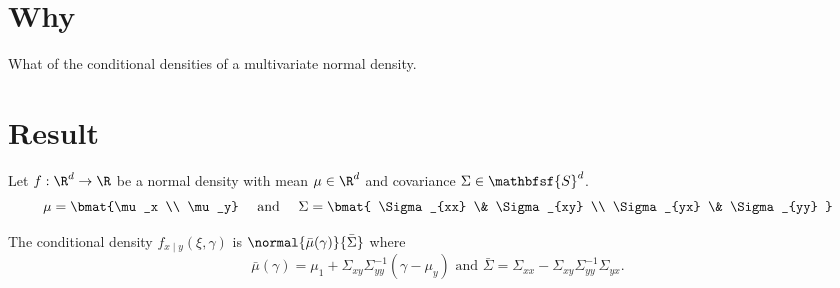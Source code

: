 

\section*{Why}

What of the conditional densities of a multivariate normal density.

\section*{Result}

\begin{proposition}
Let $f: \R ^d \to \R $ be a normal density with mean $\mu \in \R ^d$ and covariance $\Sigma  \in \mathbfsf{S} ^d$.
    \[
\mu  = \bmat{\mu _x \\ \mu _y} \quad \text{ and } \quad
\Sigma  = \bmat{
\Sigma _{xx} \& \Sigma _{xy} \\
\Sigma _{yx} \& \Sigma _{yy}
}
    \]

The conditional density $f_{x \mid y}(\xi , \gamma )$ is $\normal{\bar{\mu }(\gamma )}{\bar{\Sigma }}$ where
    \[
\bar{\mu }(\gamma ) = \mu _1 + \Sigma _{xy}\Sigma _{yy}^{-1}(\gamma - \mu _y) \text{ and } \bar{\Sigma } = \Sigma _{xx} - \Sigma _{xy}\Sigma _{yy}^{-1}\Sigma _{yx}.
    \]
\end{proposition}
\blankpage